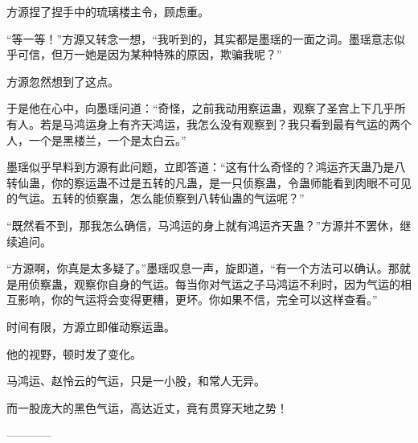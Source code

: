 \begin{this_body}
方源捏了捏手中的琉璃楼主令，顾虑重。

“等一等！”方源又转念一想，“我听到的，其实都是墨瑶的一面之词。墨瑶意志似乎可信，但万一她是因为某种特殊的原因，欺骗我呢？”

方源忽然想到了这点。

于是他在心中，向墨瑶问道：“奇怪，之前我动用察运蛊，观察了圣宫上下几乎所有人。若是马鸿运身上有齐天鸿运，我怎么没有观察到？我只看到最有气运的两个人，一个是黑楼兰，一个是太白云。”

墨瑶似乎早料到方源有此问题，立即答道：“这有什么奇怪的？鸿运齐天蛊乃是八转仙蛊，你的察运蛊不过是五转的凡蛊，是一只侦察蛊，令蛊师能看到肉眼不可见的气运。五转的侦察蛊，怎么能侦察到八转仙蛊的气运呢？”

“既然看不到，那我怎么确信，马鸿运的身上就有鸿运齐天蛊？”方源并不罢休，继续追问。

“方源啊，你真是太多疑了。”墨瑶叹息一声，旋即道，“有一个方法可以确认。那就是用侦察蛊，观察你自身的气运。每当你对气运之子马鸿运不利时，因为气运的相互影响，你的气运将会变得更糟，更坏。你如果不信，完全可以这样查看。”

时间有限，方源立即催动察运蛊。

他的视野，顿时发了变化。

马鸿运、赵怜云的气运，只是一小股，和常人无异。

而一股庞大的黑色气运，高达近丈，竟有贯穿天地之势！

------------

\end{this_body}

